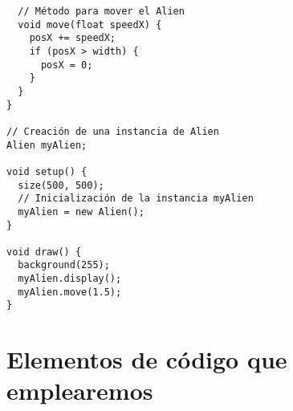 \documentclass[a4paper,oneside]{article}
\begin{document}
\begin{enumerate}
\begin{verbatim}
  // Método para mover el Alien
  void move(float speedX) {
    posX += speedX;
    if (posX > width) {
      posX = 0;
    }
  }
}

// Creación de una instancia de Alien
Alien myAlien;

void setup() {
  size(500, 500);
  // Inicialización de la instancia myAlien
  myAlien = new Alien();
}

void draw() {
  background(255);
  myAlien.display();
  myAlien.move(1.5);
}
    \end{verbatim}
\end{enumerate}

\newpage

\section{Elementos de código que emplearemos}
\end{document}
